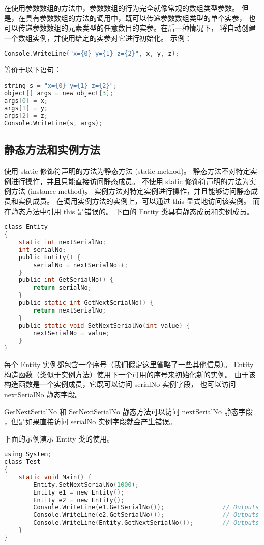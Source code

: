 在使用参数数组的方法中，参数数组的行为完全就像常规的数组类型参数。
但是，在具有参数数组的方法的调用中，既可以传递参数数组类型的单个实参，
也可以传递参数数组的元素类型的任意数目的实参。在后一种情况下，
将自动创建一个数组实例，并使用给定的实参对它进行初始化。
示例：

 \begin{lstlisting}[language=C]
Console.WriteLine("x={0} y={1} z={2}", x, y, z);
 \end{lstlisting}

等价于以下语句：

 \begin{lstlisting}[language=C]
string s = "x={0} y={1} z={2}";
object[] args = new object[3];
args[0] = x;
args[1] = y;
args[2] = z;
Console.WriteLine(s, args);
 \end{lstlisting}

\subsection{静态方法和实例方法}
使用 static 修饰符声明的方法为静态方法 (static method)。
静态方法不对特定实例进行操作，并且只能直接访问静态成员。
不使用 static 修饰符声明的方法为实例方法 (instance method)。
实例方法对特定实例进行操作，并且能够访问静态成员和实例成员。
在调用实例方法的实例上，可以通过 this 显式地访问该实例。
而在静态方法中引用 this 是错误的。
下面的 Entity 类具有静态成员和实例成员。

 \begin{lstlisting}[language=C]
class Entity
{
    static int nextSerialNo;
    int serialNo;
    public Entity() {
        serialNo = nextSerialNo++;
    }
    public int GetSerialNo() {
        return serialNo;
    }
    public static int GetNextSerialNo() {
        return nextSerialNo;
    }
    public static void SetNextSerialNo(int value) {
        nextSerialNo = value;
    }
}
 \end{lstlisting}

每个 Entity 实例都包含一个序号（我们假定这里省略了一些其他信息）。
Entity 构造函数（类似于实例方法）使用下一个可用的序号来初始化新的实例。
由于该构造函数是一个实例成员，它既可以访问 serialNo 实例字段，
也可以访问 nextSerialNo 静态字段。

GetNextSerialNo 和 SetNextSerialNo 静态方法可以访问 nextSerialNo 静态字段
，但是如果直接访问 serialNo 实例字段就会产生错误。

下面的示例演示 Entity 类的使用。

 \begin{lstlisting}[language=C]
using System;
class Test
{
    static void Main() {
        Entity.SetNextSerialNo(1000);
        Entity e1 = new Entity();
        Entity e2 = new Entity();
        Console.WriteLine(e1.GetSerialNo());                // Outputs "1000"
        Console.WriteLine(e2.GetSerialNo());                // Outputs "1001"
        Console.WriteLine(Entity.GetNextSerialNo());        // Outputs "1002"
    }
}
 \end{lstlisting}

